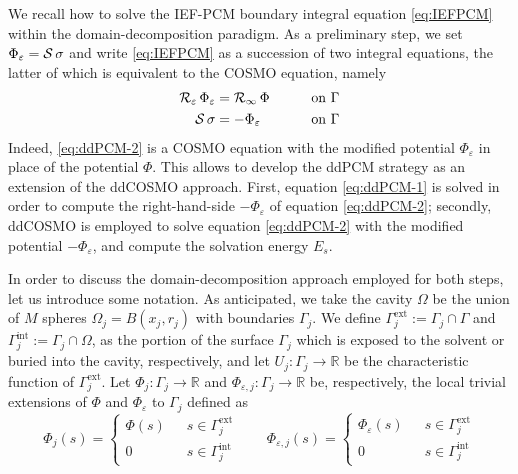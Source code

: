 We recall how to solve the IEF-PCM boundary integral equation \eqref{eq:IEFPCM} within the domain-decomposition paradigm. As a preliminary step, we set $\Phi_\varepsilon = \mathcal{S} \, \sigma$ and write \eqref{eq:IEFPCM} as a succession of two integral equations, the latter of which is equivalent to the COSMO equation\cite{Cances_Librone_PCM}, namely
\begin{alignat}{3}
\mathcal{R}_\varepsilon \, \Phi_\varepsilon & = \mathcal{R}_\infty \, \Phi \qquad && \text{on }\Gamma  \label{eq:ddPCM-1} \\
\mathcal{S} \, \sigma & = -\Phi_\varepsilon  && \text{on }\Gamma \label{eq:ddPCM-2} 
\end{alignat}
Indeed, \eqref{eq:ddPCM-2} is a COSMO equation with the modified potential $\Phi_\varepsilon$ in place of the potential $\Phi$. This allows to develop the ddPCM strategy as an extension of the ddCOSMO approach. First, equation \eqref{eq:ddPCM-1} is solved in order to compute the right-hand-side $-\Phi_\varepsilon$ of equation \eqref{eq:ddPCM-2}; secondly, ddCOSMO is employed to solve equation \eqref{eq:ddPCM-2} with the modified potential $-\Phi_\varepsilon$, and compute the solvation energy $E_s$.


In order to discuss the domain-decomposition approach employed for both steps, let us introduce some notation. As anticipated, we take the cavity $\Omega$ be the union of $M$ spheres $\Omega_j = B(x_j, r_j)$ with boundaries $\Gamma_j$. We define $\Gamma_j^\text{ext}:= \Gamma_j \cap \Gamma$ and $\Gamma_j^\text{int} := \Gamma_j \cap \Omega$, as the portion of the surface $\Gamma_j$ which is exposed to the solvent or buried into the cavity, respectively, and let $U_j: \Gamma_j \to \mathbb{R}$ be the characteristic function of $\Gamma_j^\text{ext}$. Let $\Phi_j : \Gamma_j \to \mathbb{R}$ and $\Phi_{\varepsilon,j} : \Gamma_j \to \mathbb{R}$ be, respectively, the local trivial extensions of $\Phi$ and $\Phi_\varepsilon$ to $\Gamma_j$ defined as
\begin{equation}
 \label{eq:trivial_ext}
 \Phi_j(s) = 
 \begin{cases}
  \Phi(s) \phantom{0} \quad s \in \Gamma_j^\text{ext}\\
  0 \phantom{\Phi(s)} \quad s \in \Gamma_j^\text{int}
 \end{cases}
\qquad
\Phi_{\varepsilon,j}(s) = 
 \begin{cases}
  \Phi_{\varepsilon}(s) \phantom{0} \quad s \in \Gamma_j^\text{ext}\\
  0 \phantom{\Phi(s)_{\varepsilon}} \quad s \in \Gamma_j^\text{int}
 \end{cases}
\end{equation}

